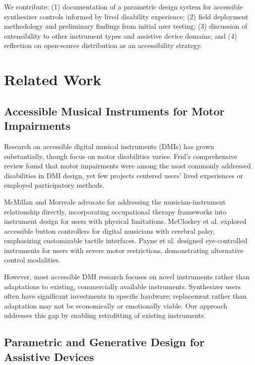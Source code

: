 \documentclass[sigconf]{nimeart}
\begin{document}

We contribute: (1) documentation of a parametric design system for accessible synthesizer controls informed by lived disability experience; (2) field deployment methodology and preliminary findings from initial user testing; (3) discussion of extensibility to other instrument types and assistive device domains; and (4) reflection on open-source distribution as an accessibility strategy.

\section{Related Work}

\subsection{Accessible Musical Instruments for Motor Impairments}

Research on accessible digital musical instruments (DMIs) has grown substantially, though focus on motor disabilities varies. Frid's comprehensive review\cite{frid2019accessible} found that motor impairments were among the most commonly addressed disabilities in DMI design, yet few projects centered users' lived experiences or employed participatory methods.

McMillan and Morreale\cite{mcmillan2023designing} advocate for addressing the musician-instrument relationship directly, incorporating occupational therapy frameworks into instrument design for users with physical limitations. McCloskey et al.\cite{mccloskey2015accessibility} explored accessible button controllers for digital musicians with cerebral palsy, emphasizing customizable tactile interfaces. Payne et al.\cite{payne2020eye} designed eye-controlled instruments for users with severe motor restrictions, demonstrating alternative control modalities.

However, most accessible DMI research focuses on novel instruments rather than adaptations to existing, commercially available instruments. Synthesizer users often have significant investments in specific hardware; replacement rather than adaptation may not be economically or emotionally viable. Our approach addresses this gap by enabling retrofitting of existing instruments.

\subsection{Parametric and Generative Design for Assistive Devices}
\end{document}
